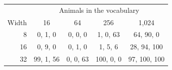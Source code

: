 \begin{tabular}{@{}rcccc@{}}
\toprule
 & \multicolumn{4}{c}{Animals in the vocabulary} \\
Width & 16 & 64 & 256 & 1{,}024 \\
\midrule
8 & 0, 1, 0 & 0, 0, 0 & 1, 0, 63 & 64, 90, 0 \\
16 & 0, 9, 0 & 0, 1, 0 & 1, 5, 6 & 28, 94, 100 \\
32 & 99, 1, 56 & 0, 0, 63 & 100, 0, 0 & 97, 100, 100 \\
\bottomrule
\end{tabular}
